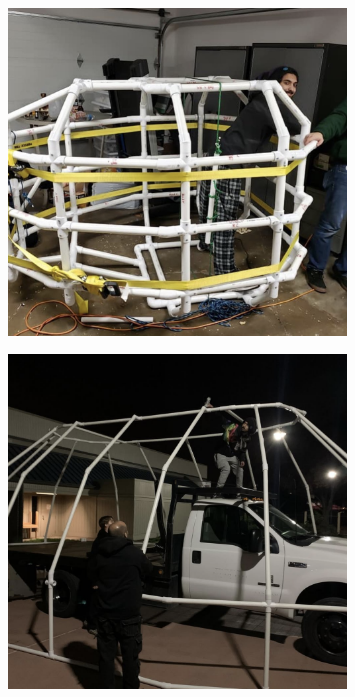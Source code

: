 \documentclass[12pt]{book}
\begin{document}
\begin{figure}
    \centering
    \includegraphics[width=0.8\textwidth]{figures/turtle_pics/s1.png}
\end{figure}

\begin{figure}
    \centering
    \includegraphics[width=0.8\textwidth]{figures/turtle_pics/s2.png}
\end{figure}
\end{document}
